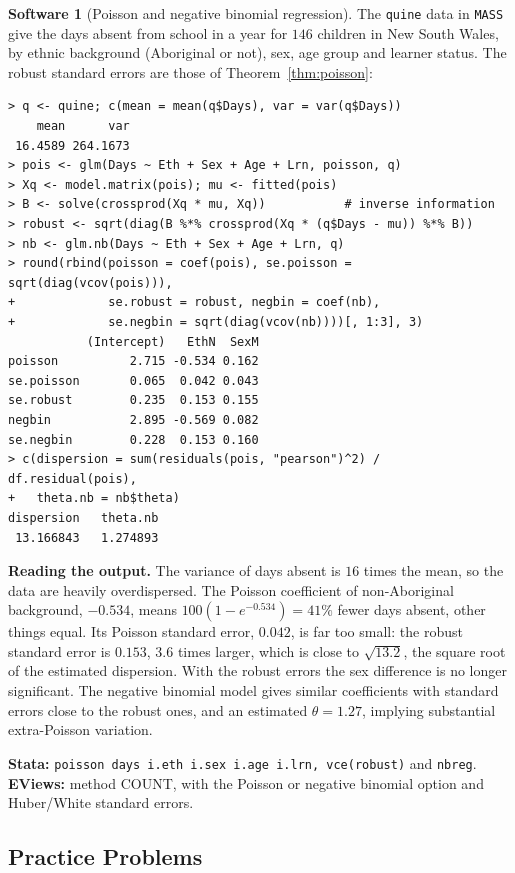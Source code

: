 \documentclass[11pt,a4paper]{article}
\numberwithin{equation}{section}
\theoremstyle{definition}
\newtheorem{software}[thm]{Software}
\begin{document}
\begin{software}[Poisson and negative binomial regression]
\label{sw:poisson}
The \texttt{quine} data in \texttt{MASS} give the days absent from school in a year for $146$ children in New South Wales, by ethnic background (Aboriginal or not),
sex, age group and learner status. The robust standard errors are those of Theorem~\ref{thm:poisson}:
{\small\begin{verbatim}
> q <- quine; c(mean = mean(q$Days), var = var(q$Days))
    mean      var 
 16.4589 264.1673 
> pois <- glm(Days ~ Eth + Sex + Age + Lrn, poisson, q)
> Xq <- model.matrix(pois); mu <- fitted(pois)
> B <- solve(crossprod(Xq * mu, Xq))           # inverse information
> robust <- sqrt(diag(B %*% crossprod(Xq * (q$Days - mu)) %*% B))
> nb <- glm.nb(Days ~ Eth + Sex + Age + Lrn, q)
> round(rbind(poisson = coef(pois), se.poisson = sqrt(diag(vcov(pois))),
+             se.robust = robust, negbin = coef(nb),
+             se.negbin = sqrt(diag(vcov(nb))))[, 1:3], 3)
           (Intercept)   EthN  SexM
poisson          2.715 -0.534 0.162
se.poisson       0.065  0.042 0.043
se.robust        0.235  0.153 0.155
negbin           2.895 -0.569 0.082
se.negbin        0.228  0.153 0.160
> c(dispersion = sum(residuals(pois, "pearson")^2) / df.residual(pois),
+   theta.nb = nb$theta)
dispersion   theta.nb 
 13.166843   1.274893 
\end{verbatim}}
\textbf{Reading the output.} The variance of days absent is $16$ times the mean, so the data are heavily overdispersed. The Poisson coefficient of non-Aboriginal
background, $-0.534$, means $100(1 - e^{-0.534}) = 41\%$ fewer days absent, other things equal. Its Poisson standard error, $0.042$, is far too small: the robust standard error is
$0.153$, $3.6$ times larger, which is close to $\sqrt{13.2}$, the square root of the estimated dispersion. With the robust errors the sex difference is no longer
significant. The negative binomial model gives similar coefficients with standard errors close to the robust ones, and an estimated $\theta = 1.27$, implying
substantial extra-Poisson variation.

\textbf{Stata:} \texttt{poisson days i.eth i.sex i.age i.lrn, vce(robust)} and \texttt{nbreg}. \textbf{EViews:} method COUNT, with the Poisson or negative
binomial option and Huber/White standard errors.
\end{software}

\subsection{Practice Problems}
\end{document}
